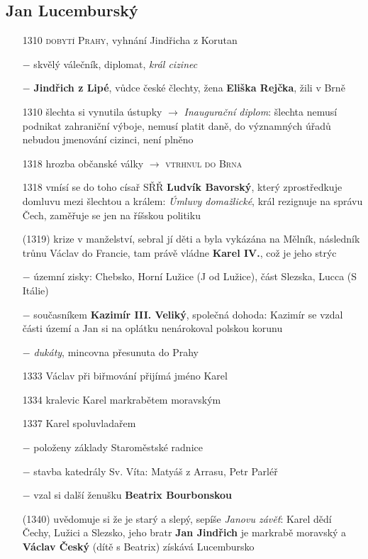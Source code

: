 \documentclass{article}
\begin{document}
\subsection*{Jan Lucemburský}
\begin{itemize}
    \vspace{-0.5em}
    \setlength\itemsep{0.15em}
    \item[1310] \textsc{dobytí Prahy}, vyhnání Jindřicha z Korutan
    \item[$-$] skvělý válečník, diplomat, \textit{král cizinec}
    \item[$-$] \textbf{Jindřich z Lipé}, vůdce české člechty, žena \textbf{Eliška Rejčka}, žili v Brně
    \item[1310] šlechta si vynutila ústupky $\rightarrow$ \textit{Inaugurační diplom}: šlechta nemusí podnikat zahraniční výboje, nemusí platit daně, do významných úřadů nebudou jmenování cizinci, není plněno
    \item[1318] hrozba občanské války $\rightarrow$ \textsc{vtrhnul do Brna}
    \item[1318] vmísí se do toho císař SŘŘ \textbf{Ludvík Bavorský}, který zprostředkuje domluvu mezi šlechtou a králem: \textit{Úmluvy domažlické}, král rezignuje na správu Čech, zaměřuje se jen na říšskou politiku
    \item[(1319)] krize v manželství, sebral jí děti a byla vykázána na Mělník, následník trůnu Václav do Francie, tam právě vládne \textbf{Karel IV.}, což je jeho strýc
    \item[$-$] územní zisky: Chebsko, Horní Lužice (J od Lužice), část Slezska, Lucca (S Itálie)
    \item[$-$] současníkem \textbf{Kazimír III. Veliký}, společná dohoda: Kazimír se vzdal části území a Jan si na oplátku nenárokoval polskou korunu
    \item[$-$] \textit{dukáty}, mincovna přesunuta do Prahy
    \item[1333] Václav při biřmování přijímá jméno Karel
    \item[1334] kralevic Karel markrabětem moravským
    \item[1337] Karel spoluvladařem
    \item[$-$] položeny základy Staroměstské radnice
    \item[$-$] stavba katedrály Sv. Víta: Matyáš z Arrasu, Petr Parléř
    \item[$-$] vzal si další ženušku \textbf{Beatrix Bourbonskou}
    \item[(1340)] uvědomuje si že je starý a slepý, sepíše \textit{Janovu závěť}: Karel dědí Čechy, Lužici a Slezsko, jeho bratr \textbf{Jan Jindřich} je markrabě moravský a \textbf{Václav Český} (dítě s Beatrix) získává Lucembursko

\end{itemize}
\end{document}
